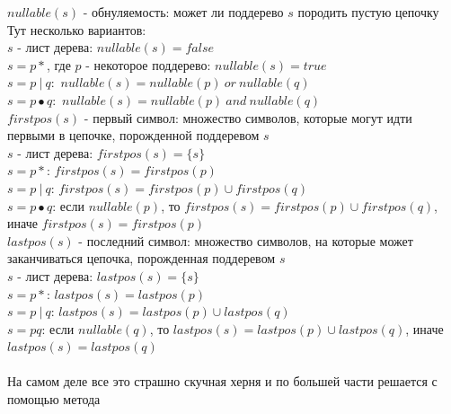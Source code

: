 \documentclass[14pt]{extreport}
\begin{document}
	$nullable(s)$ - обнуляемость: может ли поддерево $s$ породить пустую цепочку\\
	Тут несколько вариантов:\\
	\hspace*{30pt}$s$ - лист дерева: $nullable(s)=false$\\
	\hspace*{30pt}$s=p*$, где $p$ - некоторое поддерево: $nullable(s)=true$\\
	\hspace*{30pt}$s=p\ |\ q$:\ $nullable(s)=nullable(p)\ or\ nullable(q)$\\
	\hspace*{30pt}$s=p \bullet q$:\ $nullable(s)=nullable(p)\ and\ nullable(q)$\\
	$firstpos(s)$ - первый символ: множество символов, которые могут идти первыми
	в цепочке, порожденной поддеревом $s$\\
	\hspace*{30pt}$s$ - лист дерева: $firstpos(s)=\{s\}$\\
	\hspace*{30pt}$s=p*$: $firstpos(s)=firstpos(p)$\\
	\hspace*{30pt}$s=p\ |\ q$: $firstpos(s)=firstpos(p) \cup firstpos(q)$\\
	\hspace*{30pt}$s=p \bullet q$: если $nullable(p)$, то $firstpos(s)=firstpos(p) \cup firstpos(q)$,
	\hspace*{30pt}иначе $firstpos(s)=firstpos(p)$ \\
	$lastpos(s)$ - последний символ: множество символов, на которые может заканчиваться
	цепочка, порожденная поддеревом $s$\\
	\hspace*{30pt}$s$ - лист дерева: $lastpos(s)=\{s\}$\\
	\hspace*{30pt}$s=p*$: $lastpos(s)=lastpos(p)$\\
	\hspace*{30pt}$s=p\ |\ q$: $lastpos(s)=lastpos(p) \cup lastpos(q)$\\
	\hspace*{30pt}$s=pq$: если $nullable(q)$, то $lastpos(s)=lastpos(p) \cup lastpos(q)$,
	\hspace*{30pt}иначе $lastpos(s)=lastpos(q)$ \\\\
	На самом деле все это страшно скучная херня и по большей части решается с помощью метода
\end{document}
